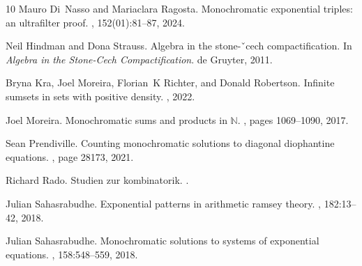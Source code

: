 \documentclass[tocmacros]{daj}
\begin{document}
\begin{thebibliography}{10}
Mauro Di~Nasso and Mariaclara Ragosta.
\newblock Monochromatic exponential triples: an ultrafilter proof.
,
  152(01):81--87, 2024.

Neil Hindman and Dona Strauss.
\newblock Algebra in the stone-ˇcech compactification.
\newblock In {\em Algebra in the Stone-Cech Compactification}. de Gruyter,
  2011.

Bryna Kra, Joel Moreira, Florian~K Richter, and Donald Robertson.
\newblock Infinite sumsets in sets with positive density.
, 2022.

Joel Moreira.
\newblock Monochromatic sums and products in $\mathbb{N}$.
, pages 1069--1090, 2017.

Sean Prendiville.
\newblock Counting monochromatic solutions to diagonal diophantine equations.
, page 28173, 2021.

Richard Rado.
\newblock Studien zur kombinatorik.
.

Julian Sahasrabudhe.
\newblock Exponential patterns in arithmetic ramsey theory.
, 182:13--42, 2018.

Julian Sahasrabudhe.
\newblock Monochromatic solutions to systems of exponential equations.
, 158:548--559, 2018.

\end{thebibliography}




\end{document}
